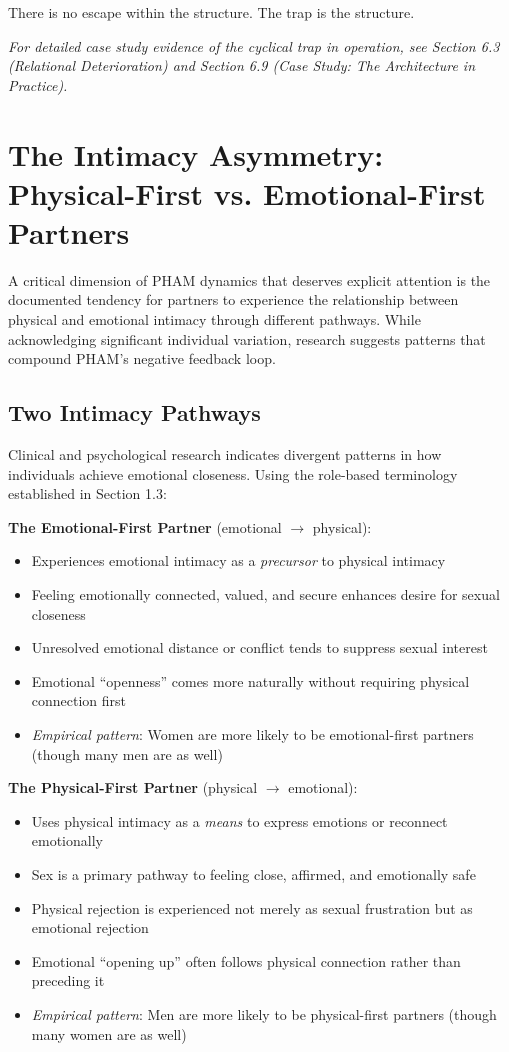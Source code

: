 \documentclass[12pt,openany]{book}
\numberwithin{equation}{chapter}
\begin{document}
There is no escape within the structure. The trap is the structure.

\textit{For detailed case study evidence of the cyclical trap in operation, see Section 6.3 (Relational Deterioration) and Section 6.9 (Case Study: The Architecture in Practice).}

\section{The Intimacy Asymmetry: Physical-First vs. Emotional-First Partners}

A critical dimension of PHAM dynamics that deserves explicit attention is the documented tendency for partners to experience the relationship between physical and emotional intimacy through different pathways. While acknowledging significant individual variation, research suggests patterns that compound PHAM's negative feedback loop.

\subsection{Two Intimacy Pathways}

Clinical and psychological research indicates divergent patterns in how individuals achieve emotional closeness. Using the role-based terminology established in Section 1.3:

\textbf{The Emotional-First Partner} (emotional $\rightarrow$ physical):
\begin{itemize}
    \item Experiences emotional intimacy as a \textit{precursor} to physical intimacy
    \item Feeling emotionally connected, valued, and secure enhances desire for sexual closeness
    \item Unresolved emotional distance or conflict tends to suppress sexual interest
    \item Emotional ``openness'' comes more naturally without requiring physical connection first
    \item \textit{Empirical pattern}: Women are more likely to be emotional-first partners (though many men are as well)
\end{itemize}

\textbf{The Physical-First Partner} (physical $\rightarrow$ emotional):
\begin{itemize}
    \item Uses physical intimacy as a \textit{means} to express emotions or reconnect emotionally
    \item Sex is a primary pathway to feeling close, affirmed, and emotionally safe
    \item Physical rejection is experienced not merely as sexual frustration but as emotional rejection
    \item Emotional ``opening up'' often follows physical connection rather than preceding it
    \item \textit{Empirical pattern}: Men are more likely to be physical-first partners (though many women are as well)
\end{itemize}
\end{document}
